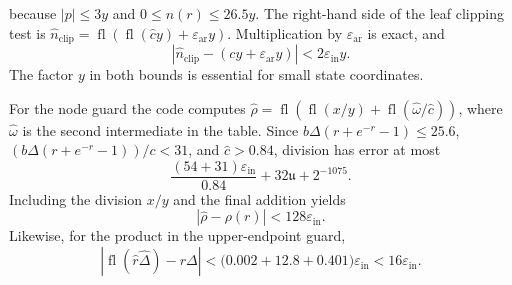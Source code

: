 because $|p|\le3y$ and $0\le n(r)\le26.5y$.
The right-hand side of the leaf clipping test is
$\widehat n_{\mathrm{clip}}=\operatorname{fl}(\operatorname{fl}(\widehat c y)
                    +\varepsilon_{\mathrm{ar}}y)$.
Multiplication by $\varepsilon_{\mathrm{ar}}$ is exact, and
\begin{equation}
 |\widehat n_{\mathrm{clip}}-(cy+\varepsilon_{\mathrm{ar}}y)|
 <2\varepsilon_{\mathrm{in}}y.
 \label{eq:certificate-clip-threshold-error}
\end{equation}
The factor $y$ in both bounds is essential for small state coordinates.

For the node guard the code computes
$\widehat\rho=\operatorname{fl}(\operatorname{fl}(x/y)
 +\operatorname{fl}(\widehat\omega/\widehat c))$,
where $\widehat\omega$ is the second intermediate in the table.
Since $b\Delta (r+e^{-r}-1)\le25.6$, $(b\Delta (r+e^{-r}-1))/c<31$, and
$\widehat c>0.84$, division has error at most
\[
 \frac{(54+31)\varepsilon_{\mathrm{in}}}{0.84}
 +32\mathfrak u+2^{-1075}.
\]
Including the division $x/y$ and the final addition yields
\begin{equation}
 |\widehat\rho-\rho(r)|<128\varepsilon_{\mathrm{in}}.
 \label{eq:certificate-ratio-error}
\end{equation}
Likewise, for the product in the upper-endpoint guard,
\begin{equation}
 |\operatorname{fl}(\widehat r\widehat\Delta)-r\Delta|
 <\bigl(0.002+12.8+0.401\bigr)\varepsilon_{\mathrm{in}}
 <16\varepsilon_{\mathrm{in}}.
 \label{eq:certificate-rate-product-error}
\end{equation}

